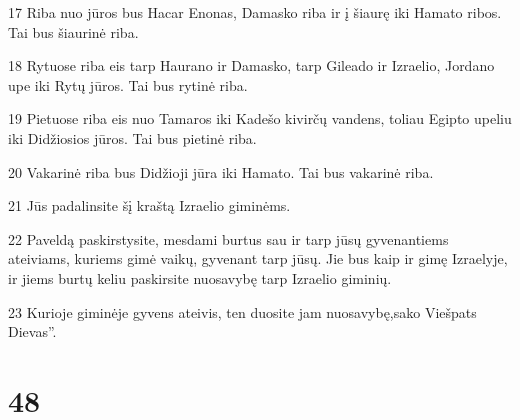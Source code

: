 \par 17 Riba nuo jūros bus Hacar Enonas, Damasko riba ir į šiaurę iki Hamato ribos. Tai bus šiaurinė riba. 
\par 18 Rytuose riba eis tarp Haurano ir Damasko, tarp Gileado ir Izraelio, Jordano upe iki Rytų jūros. Tai bus rytinė riba. 
\par 19 Pietuose riba eis nuo Tamaros iki Kadešo kivirčų vandens, toliau Egipto upeliu iki Didžiosios jūros. Tai bus pietinė riba. 
\par 20 Vakarinė riba bus Didžioji jūra iki Hamato. Tai bus vakarinė riba. 
\par 21 Jūs padalinsite šį kraštą Izraelio giminėms. 
\par 22 Paveldą paskirstysite, mesdami burtus sau ir tarp jūsų gyvenantiems ateiviams, kuriems gimė vaikų, gyvenant tarp jūsų. Jie bus kaip ir gimę Izraelyje, ir jiems burtų keliu paskirsite nuosavybę tarp Izraelio giminių. 
\par 23 Kurioje giminėje gyvens ateivis, ten duosite jam nuosavybę,­sako Viešpats Dievas”.



\chapter{48}


